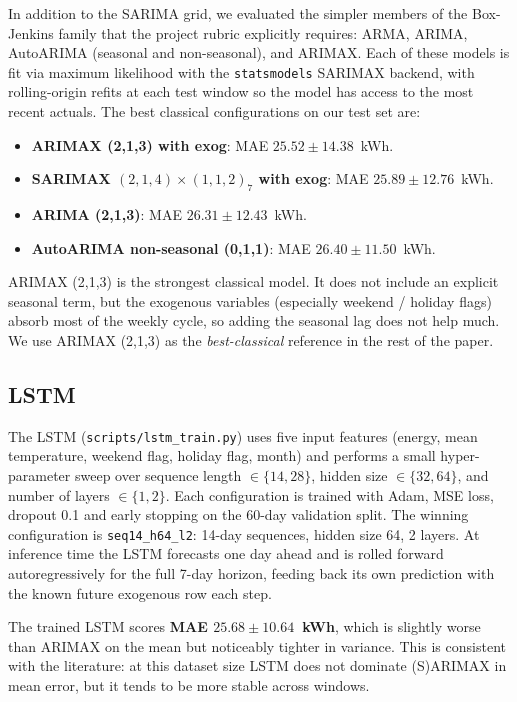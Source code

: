 In addition to the SARIMA grid, we evaluated the simpler members of
the Box-Jenkins family that the project rubric explicitly requires:
ARMA, ARIMA, AutoARIMA (seasonal and non-seasonal), and ARIMAX. Each
of these models is fit via maximum likelihood with the
\texttt{statsmodels} SARIMAX backend, with rolling-origin refits at
each test window so the model has access to the most recent
actuals. The best classical configurations on our test set are:
\begin{itemize}[leftmargin=*]
    \item \textbf{ARIMAX (2,1,3) with exog}: MAE $25.52 \pm 14.38$~kWh.
    \item \textbf{SARIMAX $(2,1,4)\!\times\!(1,1,2)_7$ with exog}:
    MAE $25.89 \pm 12.76$~kWh.
    \item \textbf{ARIMA (2,1,3)}: MAE $26.31 \pm 12.43$~kWh.
    \item \textbf{AutoARIMA non-seasonal (0,1,1)}:
    MAE $26.40 \pm 11.50$~kWh.
\end{itemize}
ARIMAX (2,1,3) is the strongest classical model. It does not include
an explicit seasonal term, but the exogenous variables (especially
weekend / holiday flags) absorb most of the weekly cycle, so adding
the seasonal lag does not help much. We use ARIMAX (2,1,3) as the
\emph{best-classical} reference in the rest of the paper.

\subsection{LSTM}

The LSTM (\texttt{scripts/lstm\_train.py}) uses five input features
(energy, mean temperature, weekend flag, holiday flag, month) and
performs a small hyper-parameter sweep over sequence length
$\in \{14, 28\}$, hidden size $\in \{32, 64\}$, and number of layers
$\in \{1, 2\}$. Each configuration is trained with Adam, MSE loss,
dropout 0.1 and early stopping on the 60-day validation split. The
winning configuration is \texttt{seq14\_h64\_l2}: 14-day sequences,
hidden size 64, 2 layers. At inference time the LSTM forecasts one
day ahead and is rolled forward autoregressively for the full 7-day
horizon, feeding back its own prediction with the known future
exogenous row each step.

The trained LSTM scores \textbf{MAE $25.68 \pm 10.64$~kWh}, which is
slightly worse than ARIMAX on the mean but noticeably tighter in
variance. This is consistent with the literature: at this dataset size
LSTM does not dominate (S)ARIMAX in mean error, but it tends to be
more stable across windows.

